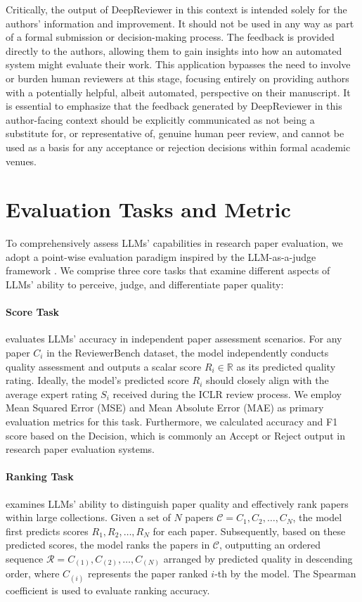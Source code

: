 \documentclass{article}
\begin{document}
Critically, the output of DeepReviewer in this context is intended solely for the authors' information and improvement. It should not be used in any way as part of a formal submission or decision-making process. The feedback is provided directly to the authors, allowing them to gain insights into how an automated system might evaluate their work. This application bypasses the need to involve or burden human reviewers at this stage, focusing entirely on providing authors with a potentially helpful, albeit automated, perspective on their manuscript. It is essential to emphasize that the feedback generated by DeepReviewer in this author-facing context should be explicitly communicated as not being a substitute for, or representative of, genuine human peer review, and cannot be used as a basis for any acceptance or rejection decisions within formal academic venues.


\section{Evaluation Tasks and Metric}
\label{appendix:eval}
To comprehensively assess LLMs' capabilities in research paper evaluation, we adopt a point-wise evaluation paradigm inspired by the LLM-as-a-judge framework \citep{li2024llmasajudge,wang2024pandalm,rewina2025potential,swarnadeep2025learning}. We comprise three core tasks that examine different aspects of LLMs' ability to perceive, judge, and differentiate paper quality:

\paragraph{Score Task} evaluates LLMs' accuracy in independent paper assessment scenarios. For any paper $C_i$ in the ReviewerBench dataset, the model independently conducts quality assessment and outputs a scalar score $R_i \in \mathbb{R}$ as its predicted quality rating. Ideally, the model's predicted score $R_i$ should closely align with the average expert rating $S_i$ received during the ICLR review process. We employ Mean Squared Error (MSE) and Mean Absolute Error (MAE) as primary evaluation metrics for this task. Furthermore, we calculated accuracy and F1 score based on the Decision, which is commonly an Accept or Reject output in research paper evaluation systems.

\paragraph{Ranking Task} examines LLMs' ability to distinguish paper quality and effectively rank papers within large collections. Given a set of $N$ papers $\mathcal{C} = {C_1, C_2, \dots, C_N}$, the model first predicts scores ${R_1, R_2, \dots, R_N}$ for each paper. Subsequently, based on these predicted scores, the model ranks the papers in $\mathcal{C}$, outputting an ordered sequence $\mathcal{R} = {C_{(1)}, C_{(2)}, \dots, C_{(N)}}$ arranged by predicted quality in descending order, where $C_{(i)}$ represents the paper ranked $i$-th by the model. The Spearman coefficient is used to evaluate ranking accuracy.
\end{document}
